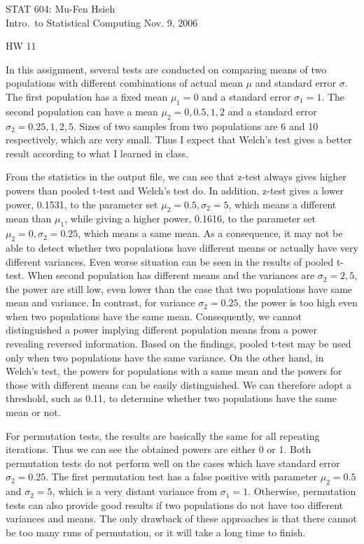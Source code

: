 \documentclass[12pt]{article}
\begin{document}
STAT 604: \hfill {Mu-Fen Hsieh}\\
Intro.\ to Statistical Computing \hfill {Nov. 9, 2006}

\begin{center}
\Large HW 11\\
\end{center}

In this assignment, several tests are conducted on comparing means of two populations with different combinations
of actual mean $\mu$ and standard error $\sigma$. The first population has a fixed mean $\mu_1=0$ and a standard
error $\sigma_1=1$. The second population can have a mean $\mu_2=0, 0.5, 1, 2$ and a standard error 
$\sigma_2=0.25, 1, 2, 5$. Sizes of two samples from two populations are 6 and 10 respectively, 
which are very small. 
Thus I expect that Welch's test gives a better result according to what I learned in class. 

From the statistics in the output file,
we can see that z-test always gives higher powers than pooled t-test and Welch's test do.
In addition, z-test gives a lower power, 0.1531, to the parameter set $\mu_2=0.5, \sigma_2=5$, 
which means a different
mean than $\mu_1$, while giving a higher power, 0.1616, to the parameter set $\mu_2=0, \sigma_2=0.25$, which means 
a same mean. As a consequence, it may not be able to detect whether 
two populations have different
means or actually have very different variances. Even worse situation can be seen in the results 
of pooled t-test. When second population has different means and the variances are $\sigma_2=2, 5$,
the power are still low, even lower than the case that two populations have same mean and variance.
In contrast, for variance $\sigma_2=0.25$, the power is too high 
even when two populations have the same mean.
Consequently, we cannot distinguished a power implying different population means from a power
revealing reversed information. Based on the findings, pooled t-test may be used only 
when two populations have the same variance. On the other hand, in Welch's test, the powers for 
 populations with a same mean and the powers for those with different means can be easily distinguished.
We can therefore adopt a threshold, such as 0.11, to determine whether two populations have the same mean or not.

For permutation tests, the results are basically the same for all repeating iterations. Thus we can see
the obtained powers are either 0 or 1. Both permutation tests do not perform well on the cases which
have standard error $\sigma_2=0.25$. The first permutation test has a false positive with parameter 
$\mu_2=0.5$ and $\sigma_2=5$, which is a very distant variance from $\sigma_1=1$.
Otherwise, permutation tests can also provide good results if two populations do not have too different variances and means.
The only drawback of these approaches is 
that there cannot be too many runs of permutation, or it will take a long time to finish.
\end{document}
